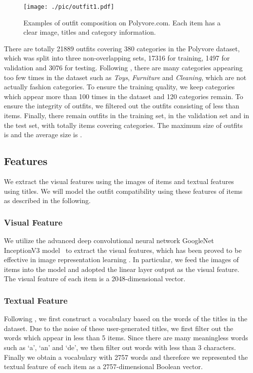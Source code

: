 \documentclass[sigconf]{acmart}
\begin{document}
\begin{figure}[t]
  \centering
\texttt{[image: ./pic/outfit1.pdf]}
  \caption{Examples of outfit composition on Polyvore.com. Each item has a clear image, titles and category information.}\label{fig:outfit_example}
\end{figure}


There are totally 21889 outfits covering 380 categories in the Polyvore dataset, which was split into three non-overlapping sets, 17316 for training, 1497 for validation and 3076 for testing.
Following \cite{song2017neurostylist},
there are many categories appearing too few times in the dataset such as \emph{Toys}, \emph{Furniture} and \emph{Cleaning}, which are not actually fashion categories. To ensure the training quality, we keep categories which appear more than 100 times in the dataset and 120 categories remain.
To ensure the integrity of outfits, we filtered out the outfits consisting of less than  items.
Finally, there remain  outfits in the training set,  in the validation set and  in the test set, with totally  items covering  categories. The maximum size of outfits is  and the average size is .


\subsection{Features} \label{sect:feature}
We extract the visual features using the images of items and textual features using titles. We will model the outfit compatibility using these features of items as described in the following.

\subsubsection{Visual Feature}
We utilize the advanced deep convolutional neural network GoogleNet InceptionV3 model~\cite{szegedy2016rethinking} to extract the visual features, which has been proved to be effective in image representation learning \cite{han2017learning,lee2017style2vec,sharif2014cnn,donahue2014decaf}.
In particular, we feed the images of items into the model and adopted the linear layer output as the visual feature. The visual feature of each item is a 2048-dimensional vector.

\subsubsection{Textual Feature}
Following \cite{song2017neurostylist}, we first construct a vocabulary based on the words of the titles in the dataset.
 Due to the noise of these user-generated titles, we first filter out the words which appear in less than 5 items. Since there are many meaningless words such as `a', `an' and `de', we then filter out words with less than 3 characters.
Finally we obtain a vocabulary with 2757 words and therefore we represented the textual feature of each item as a 2757-dimensional Boolean vector.
\end{document}
